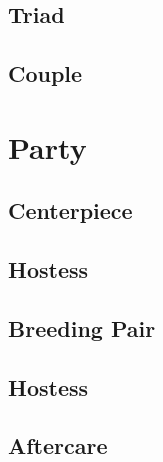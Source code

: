 \documentclass[12pt,letterpaper,oneside]{memoir}
\begin{document}
  \section{Triad}
  

  \section{Couple}
  

  \chapter{Party}

  \section{Centerpiece}
  

  \section{Hostess}
  

  \section{Breeding Pair}
  

  \section{Hostess}
  

  \section{Aftercare}
  
\end{document}
